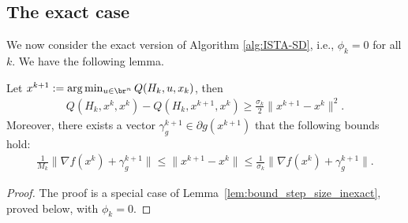 \documentclass[11pt]{article}
\numberwithin{equation}{section}
\begin{document}
\subsection{The exact case}
We now consider the exact version of Algorithm \ref{alg:ISTA-SD}, i.e., $\phi_k=0$ for all $k$. 
We have the following lemma. 
\begin{lemma}\label{lem:bound_step_size}
Let $x^{k+1}:=\arg\min_{u\in\br^n} Q(H_k, u,x_k)$, then 
\begin{align}
	\label{equ:bound_Qk_Qk1}
    Q(H_k,x^k,x^k) - Q(H_k,x^{k+1}, x^k) \geq \frac{\sigma_k}{2}\|x^{k+1}-x^k\|^2.
\end{align}
Moreover, there exists a vector $\gamma_g^{k+1} \in \partial g(x^{k+1})$ that the following bounds hold: 
\begin{align}
    \label{equ:bound_step_size}
    \frac{1}{M_k}\|  \nabla f(x^k) + \gamma_{g}^{k+1} \|
    \leq 
    \|x^{k+1} - x^k\| 
    \leq 
    \frac{1}{\sigma_k}\|  \nabla f(x^k) + \gamma_{g}^{k+1} \|.
\end{align}
\end{lemma}
\begin{proof}
     The proof is a special case of Lemma~\ref{lem:bound_step_size_inexact}, proved below, with $\phi_k=0$.
\end{proof}
\end{document}
